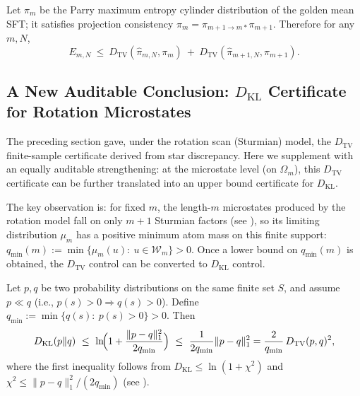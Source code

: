 \begin{proposition}\label{prop:multiscale-residual-parry-bound}
Let \(\pi_m\) be the Parry maximum entropy cylinder distribution of the golden mean SFT; it satisfies projection consistency \(\pi_m=\pi_{m+1\to m*}\pi_{m+1}\). Therefore for any \(m,N\),
\[
E_{m,N}\ \le\ D_{\mathrm{TV}}(\hat{\pi}_{m,N},\pi_m)\ +\ D_{\mathrm{TV}}(\hat{\pi}_{m+1,N},\pi_{m+1}).
\]
\end{proposition}



\subsection{A New Auditable Conclusion: \texorpdfstring{$D_{\mathrm{KL}}$}{KL} Certificate for Rotation Microstates}

The preceding section gave, under the rotation scan (Sturmian) model, the \(D_{\mathrm{TV}}\) finite-sample certificate derived from star discrepancy.
Here we supplement with an equally auditable strengthening: at the microstate level (on \(\Omega_m\)), this \(D_{\mathrm{TV}}\) certificate can be further translated into an upper bound certificate for \(D_{\mathrm{KL}}\).

The key observation is: for fixed \(m\), the length-\(m\) microstates produced by the rotation model fall on only \(m{+}1\) Sturmian factors (see \cite{MorseHedlund1940,LindMarcus1995}), so its limiting distribution \(\mu_m\) has a positive minimum atom mass on this finite support:
\(
q_{\min}(m):=\min\{\mu_m(u):\ u\in\mathcal{W}_m\}>0
\). Once a lower bound on \(q_{\min}(m)\) is obtained, the \(D_{\mathrm{TV}}\) control can be converted to \(D_{\mathrm{KL}}\) control.

\begin{lemma}\label{lem:kl-from-tv-qmin}
Let \(p,q\) be two probability distributions on the same finite set \(S\), and assume \(p\ll q\) (i.e., \(p(s)>0\Rightarrow q(s)>0\)). Define
\(
q_{\min}:=\min\{q(s):\ p(s)>0\}>0
\). Then
\[
D_{\mathrm{KL}}(p\|q)\ \le\ \ln\!\Bigl(1+\frac{\|p-q\|_1^2}{2q_{\min}}\Bigr)
\ \le\ \frac{1}{2q_{\min}}\|p-q\|_1^2
=\frac{2}{q_{\min}}\,D_{\mathrm{TV}}(p,q)^2,
\]
where the first inequality follows from \(D_{\mathrm{KL}}\le \ln(1+\chi^2)\) and \(\chi^2\le \|p-q\|_1^2/(2q_{\min})\) (see \cite{SasonVerdu2016fDivergence}).
\end{lemma}

